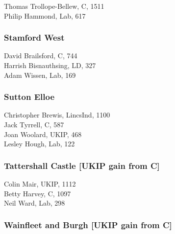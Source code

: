 \documentclass[a4paper,openany,10pt]{book}
\begin{document}
{Thomas Trollope-Bellew}, C, 1511\\
Philip Hammond, Lab, 617\\


\subsubsection*{Stamford West}



David Brailsford, C, 744\\
Harrish Bisnauthsing, LD, 327\\
Adam Wissen, Lab, 169\\


\subsubsection*{Sutton Elloe}



{Christopher Brewis}, LincsInd, 1100\\
Jack Tyrrell, C, 587\\
Joan Woolard, UKIP, 468\\
Lesley Hough, Lab, 122\\


\subsubsection*{Tattershall Castle \hspace*{\fill}\nolinebreak[1]%
\enspace\hspace*{\fill}
[UKIP gain from C]}



Colin Mair, UKIP, 1112\\
Betty Harvey, C, 1097\\
Neil Ward, Lab, 298\\


\subsubsection*{Wainfleet and Burgh \hspace*{\fill}\nolinebreak[1]%
\enspace\hspace*{\fill}
[UKIP gain from C]}
\end{document}
